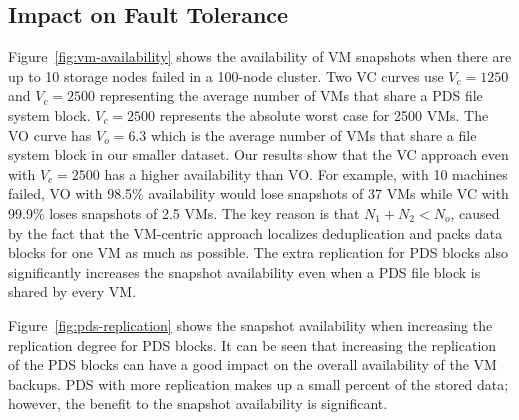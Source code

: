 \subsection{Impact on Fault Tolerance}
Figure~\ref{fig:vm-availability} shows the availability of VM snapshots when 
there are up to 10 storage nodes failed in a 100-node cluster. 
Two VC curves use $V_c=1250$ and $V_c=2500$ representing the average number of VMs that share a PDS file system block. 
$V_c=2500$ represents  the absolute worst case for 2500 VMs. 
The VO curve has  $V_o=6.3$ which is  the average number of VMs that share a file system block in our smaller dataset. 
Our results show that the VC approach even with $V_c=2500$ has a higher availability than VO.
For example, with 10 machines failed, VO with 98.5\% availability would lose snapshots of 37 VMs 
while VC with 99.9\% loses snapshots of 2.5 VMs.
The key reason is that  $N_1 +N_2 < N_o$, caused by the fact that the VM-centric approach localizes deduplication
and packs  data blocks for one VM as much as possible.  The extra replication
for PDS blocks also significantly increases the snapshot availability even when
a PDS file block is shared by every VM.

Figure~\ref{fig:pds-replication}
shows the snapshot availability when increasing the replication degree for PDS blocks. 
It can be seen that increasing the replication of 
the PDS blocks can have a good impact on the overall availability of the VM backups. 
PDS with more replication  makes up a small percent of the
stored data; however, the benefit to the snapshot availability is significant. 

